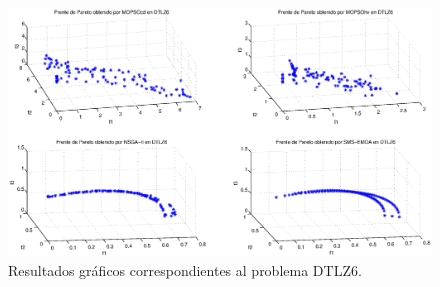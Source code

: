 \clearpage
\newpage
\begin{figure}
      \begin{center}
	  \includegraphics[scale=0.45]{Cap4/rdtlz6r.eps}
      \end{center}
	\caption{Resultados gr\'aficos correspondientes al problema DTLZ6.}
      \label{fig:rDTLZ6}
      \end{figure}
\clearpage
\newpage

